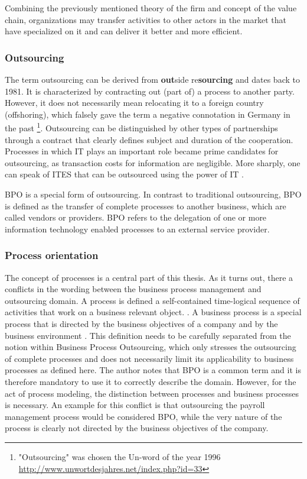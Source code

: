 		Combining the previously mentioned theory of the firm and concept of the value chain, organizations may transfer activities to other actors in the market that have specialized on it and can deliver it better and more efficient.  
		
			\subsubsection{Outsourcing}
		The term outsourcing can be derived from \textbf{out}side re\textbf{sourcing} and dates back to 1981. It is characterized by contracting out (part of) a process to another party. However, it does not necessarily mean relocating it to a foreign country (offshoring), which falsely gave the term a negative connotation in Germany in the past \footnote{ "Outsourcing" was chosen the Un-word of the year 1996 \url{http://www.unwortdesjahres.net/index.php?id=33}}. Outsourcing can be distinguished by other types of partnerships through a contract that clearly defines subject and duration of the cooperation. Processes in which IT plays an important role became prime candidates for outsourcing, as transaction costs for information are negligible. More sharply, one can speak of \acrfull{ITES} that can be outsourced using the power of IT \citep[]{Ramachandran2004}. 
				
		\acrshort{BPO} is a special form of outsourcing. In contrast to traditional outsourcing, BPO is defined as the transfer of complete processes to another business, which are called vendors or providers. BPO refers to the delegation of one or more information technology enabled processes to an external service provider. 
		
		\subsubsection{Process orientation}
		
	The concept of processes is a central part of this thesis. As it turns out, there a conflicts in the wording between the business process management and outsourcing domain. A process is defined a self-contained time-logical sequence of activities that work on a business relevant object. \citep[]{becker2012pm}. A business process is a special process that is directed by the business objectives of a company and by the business environment \citep[]{becker2012pm}. This definition needs to be carefully separated from the notion within Business Process Outsourcing, which only stresses the outsourcing of complete processes and does not necessarily limit its applicability to business processes as defined here. The author notes that BPO is a common term and it is therefore mandatory to use it to correctly describe the domain. However, for the act of process modeling, the distinction between processes and business processes is necessary. An example for this conflict is that outsourcing the payroll management process would be considered BPO, while the very nature of the process is clearly not directed by the business objectives of the company. 
	
